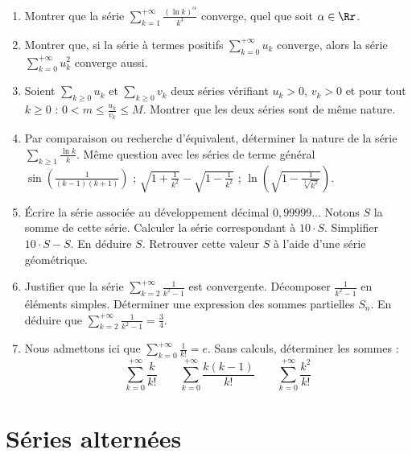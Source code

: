 \documentclass[class=report,crop=false]{standalone}
\begin{document}
\begin{miniexercices}
\begin{enumerate}

  \item Montrer que la série 
  $\displaystyle \sum_{k=1}^{+\infty} \frac{(\ln k)^\alpha}{k^3}$ converge, 
  quel que soit $\alpha \in \Rr$.
  
  \item Montrer que, si la série à termes positifs $\sum_{k=0}^{+\infty} u_k$ converge, 
  alors la série $\sum_{k=0}^{+\infty} u_k^2$ converge aussi.

  \item Soient  $\sum_{k\ge0} u_k$ et $\sum_{k\ge0} v_k$ deux séries 
  vérifiant $u_k>0$, $v_k>0$ et pour tout $k\ge0$ :
  $0<m \le \frac{u_k}{v_k} \le M$.
  Montrer que les deux séries sont de même nature.

  \item Par comparaison ou recherche d'équivalent, déterminer la nature de la série
  $\sum_{k \ge 1} \frac{\ln k}{k}$.
  Même question avec les séries de terme général 
  $\sin \left(\frac{1}{(k-1)(k+1)}\right)$ ;
  $\sqrt{1+\frac{1}{k^2}}-\sqrt{1-\frac{1}{k^2}}$ ; 
  $\ln\left(\sqrt{1-\frac{1}{\sqrt[3]{k^2}}}\right)$.
  
  
  \item \'Ecrire la série associée au développement décimal $0,99999\ldots$
  Notons $S$ la somme de cette série. Calculer la série correspondant à $10 \cdot S$. Simplifier
  $10 \cdot S - S$. En déduire $S$. Retrouver cette valeur $S$ 
  à l'aide d'une série géométrique.
  
  
  \item Justifier que la série $\sum_{k=2}^{+\infty} \frac{1}{k^2-1}$ est convergente.
  Décomposer $\frac{1}{k^2-1}$ en éléments simples. 
  Déterminer une expression des sommes partielles $S_n$.
  En déduire que $\sum_{k=2}^{+\infty} \frac{1}{k^2-1} = \frac34$.

  \item Nous admettons ici que $\sum_{k=0}^{+\infty}\frac{1}{k!} = e$.
  Sans calculs, déterminer les sommes :
  $$\sum_{k=0}^{+\infty}\frac{k}{k!} \qquad 
  \sum_{k=0}^{+\infty}\frac{k(k-1)}{k!} \qquad
  \sum_{k=0}^{+\infty}\frac{k^2}{k!}$$
\end{enumerate}
\end{miniexercices}


\section{Séries alternées}
\end{document}
